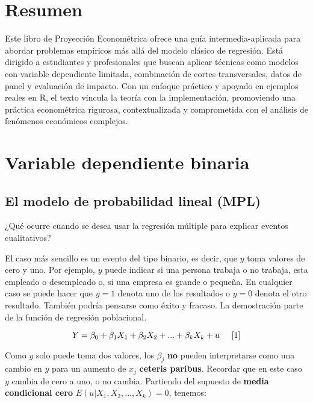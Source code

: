 \documentclass[
  letterpaper,
  DIV=11,
  numbers=noendperiod]{scrreprt}
\begin{document}

\chapter{Resumen}\label{resumen}

Este libro de Proyección Econométrica ofrece una guía
intermedia-aplicada para abordar problemas empíricos más allá del modelo
clásico de regresión. Está dirigido a estudiantes y profesionales que
buscan aplicar técnicas como modelos con variable dependiente limitada,
combinación de cortes transversales, datos de panel y evaluación de
impacto. Con un enfoque práctico y apoyado en ejemplos reales en R, el
texto vincula la teoría con la implementación, promoviendo una práctica
econométrica rigurosa, contextualizada y comprometida con el análisis de
fenómenos económicos complejos.


\chapter{Variable dependiente
binaria}\label{variable-dependiente-binaria}

\section{El modelo de probabilidad lineal
(MPL)}\label{el-modelo-de-probabilidad-lineal-mpl}

¿Qué ocurre cuando se desea usar la regresión múltiple para explicar
eventos cualitativos?

El caso más sencillo es un evento del tipo binario, es decir, que \(y\)
toma valores de cero y uno. Por ejemplo, \(y\) puede indicar si una
persona trabaja o no trabaja, esta empleado o desempleado o, si una
empresa es grande o pequeña. En cualquier caso se puede hacer que
\(y=1\) denota uno de los resultados o \(y=0\) denota el otro resultado.
También podría pensarse como éxito y fracaso. La demostración parte de
la función de regresión poblacional.

\[
Y=\beta_0+\beta_1X_1+\beta_2X_2+...+\beta_kX_k+u \hspace{0.5cm}[1]
\]

Como \(y\) solo puede toma dos valores, los \(\beta_j\) \textbf{no}
pueden interpretarse como una cambio en \(y\) para un aumento de \(x_j\)
\textbf{ceteris paribus}. Recordar que en este caso \(y\) cambia de cero
a uno, o no cambia. Partiendo del supuesto de \textbf{media condicional
cero} \(E(u|X_1, X_2,...,X_k)=0\), tenemos:
\end{document}
